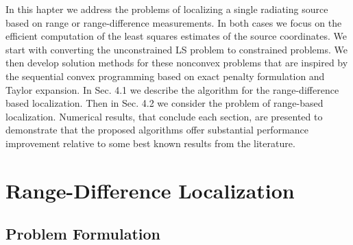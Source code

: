 \label{chapter:scp}

%
%
%
%


In this hapter we address the problems of localizing a single radiating source based on range or range-difference measurements. In both cases we focus on the efficient computation of the least squares estimates of the source coordinates. We start with converting the unconstrained LS problem to  constrained problems. We then develop solution methods for these nonconvex problems that are inspired by the sequential convex programming based on exact penalty formulation and Taylor expansion. In Sec. 4.1 we describe the  algorithm for the range-difference based localization. Then in Sec. 4.2 we consider the problem of range-based localization. Numerical results, that conclude each section, are presented to demonstrate that the proposed algorithms offer substantial performance improvement relative to some best known results from the literature.



\section{Range-Difference Localization}
\subsection{Problem Formulation}

